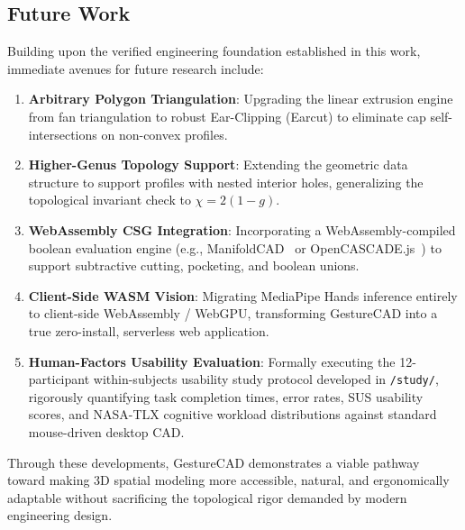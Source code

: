 \subsection{Future Work}
Building upon the verified engineering foundation established in this work, immediate avenues for future research include:
\begin{enumerate}
    \item \textbf{Arbitrary Polygon Triangulation}: Upgrading the linear extrusion engine from fan triangulation to robust Ear-Clipping (Earcut) to eliminate cap self-intersections on non-convex profiles.
    \item \textbf{Higher-Genus Topology Support}: Extending the geometric data structure to support profiles with nested interior holes, generalizing the topological invariant check to $\chi = 2(1 - g)$.
    \item \textbf{WebAssembly CSG Integration}: Incorporating a WebAssembly-compiled boolean evaluation engine (e.g., ManifoldCAD~\cite{manifoldcad} or OpenCASCADE.js~\cite{opencascadejs}) to support subtractive cutting, pocketing, and boolean unions.
    \item \textbf{Client-Side WASM Vision}: Migrating MediaPipe Hands inference entirely to client-side WebAssembly / WebGPU, transforming GestureCAD into a true zero-install, serverless web application.
    \item \textbf{Human-Factors Usability Evaluation}: Formally executing the 12-participant within-subjects usability study protocol developed in \texttt{/study/}, rigorously quantifying task completion times, error rates, SUS usability scores, and NASA-TLX cognitive workload distributions against standard mouse-driven desktop CAD.
\end{enumerate}
Through these developments, GestureCAD demonstrates a viable pathway toward making 3D spatial modeling more accessible, natural, and ergonomically adaptable without sacrificing the topological rigor demanded by modern engineering design.
